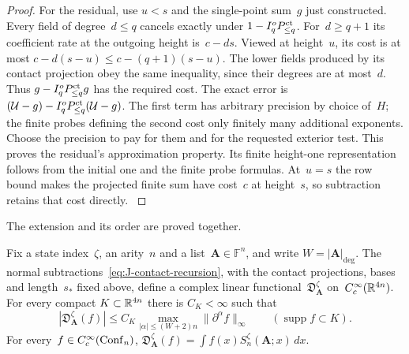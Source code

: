 \begin{proof}
For the residual, use $u<s$ and the single-point sum~$g$ just constructed. Every field of degree~$d\le q$ cancels exactly under $1-I_q^oP_{\le q}^{\rm ct}$. For~$d\ge q+1$ its coefficient rate at the outgoing height is~$c-ds$. Viewed at height~$u$, its cost is at most $c-d(s-u)\le c-(q+1)(s-u)$.
The lower fields produced by its contact projection obey the same inequality, since their degrees are at most~$d$. Thus $g-I_q^oP_{\le q}^{\rm ct}g$ has the required cost. The exact error is $(\mathcal U-g)-I_q^oP_{\le q}^{\rm ct}(\mathcal U-g)$.
The first term has arbitrary precision by choice of~$H$; the finite probes defining the second cost only finitely many additional exponents. Choose the precision to pay for them and for the requested exterior test. This proves the residual's approximation property. Its finite height-one representation follows from the initial one and the finite probe formulas. At~$u=s$ the row bound makes the projected finite sum have cost~$c$ at height~$s$, so subtraction retains that cost directly.
\label{proof:J-layer-end}
\end{proof}

The extension and its order are proved together.

\begin{lemma}\label{lem:J2.2}\label{lem:J2.3}
Fix a state index~$\zeta$, an arity~$n$ and a list~$\boldsymbol A\in\mathbb F^n$, and write $W=|\boldsymbol A|_{\deg}$. The normal subtractions~\eqref{eq:J-contact-recursion}, with the contact projections, bases and length~$s_*$ fixed above, define a complex linear functional~$\mathfrak D_{\boldsymbol A}^\zeta$ on~$C_c^\infty(\mathbb{R}^{4n})$. For every compact $K\subset\mathbb{R}^{4n}$ there is $C_K<\infty$ such that
\begin{equation*}
|\mathfrak D_{\boldsymbol A}^\zeta(f)|
\le C_K\max_{|\alpha|\le(W+2)n}\|\partial^\alpha f\|_\infty
\qquad(\operatorname{supp}f\subset K).
\end{equation*}
For every~$f\in C_c^\infty(\mathrm{Conf}_{n})$, $\mathfrak D_{\boldsymbol A}^\zeta(f)=\int f(x)S_n^\zeta(\boldsymbol A;x)\,dx$.
\end{lemma}

